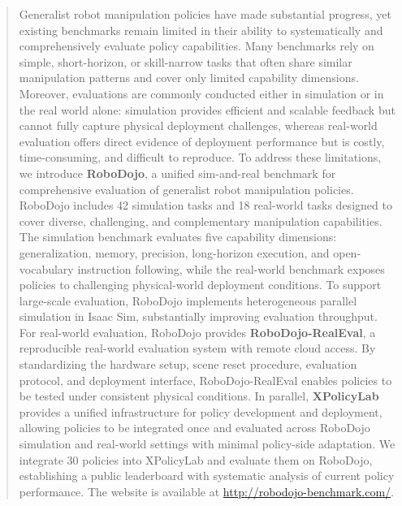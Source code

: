 \begin{abstract}

Generalist robot manipulation policies have made substantial progress, yet existing benchmarks remain limited in their ability to systematically and comprehensively evaluate policy capabilities. Many benchmarks rely on simple, short-horizon, or skill-narrow tasks that often share similar manipulation patterns and cover only limited capability dimensions. Moreover, evaluations are commonly conducted either in simulation or in the real world alone: simulation provides efficient and scalable feedback but cannot fully capture physical deployment challenges, whereas real-world evaluation offers direct evidence of deployment performance but is costly, time-consuming, and difficult to reproduce. To address these limitations, we introduce \textbf{\textcolor{Blue_1}{RoboDojo}}, a unified sim-and-real benchmark for comprehensive evaluation of generalist robot manipulation policies. RoboDojo includes 42 simulation tasks and 18 real-world tasks designed to cover diverse, challenging, and complementary manipulation capabilities. The simulation benchmark evaluates five capability dimensions: generalization, memory, precision, long-horizon execution, and open-vocabulary instruction following, while the real-world benchmark exposes policies to challenging physical-world deployment conditions. To support large-scale evaluation, RoboDojo implements heterogeneous parallel simulation in Isaac Sim, substantially improving evaluation throughput. For real-world evaluation, RoboDojo provides \textbf{\textcolor{Blue_1}{RoboDojo-RealEval}}, a reproducible real-world evaluation system with remote cloud access. By standardizing the hardware setup, scene reset procedure, evaluation protocol, and deployment interface, RoboDojo-RealEval enables policies to be tested under consistent physical conditions. In parallel, \textbf{\textcolor{Blue_1}{XPolicyLab}} provides a unified infrastructure for policy development and deployment, allowing policies to be integrated once and evaluated across RoboDojo simulation and real-world settings with minimal policy-side adaptation. We integrate 30 policies into XPolicyLab and evaluate them on RoboDojo, establishing a public leaderboard with systematic analysis of current policy performance. The website is available at \href{http://robodojo-benchmark.com/}{http://robodojo-benchmark.com/}.

\vspace{0.6em}
\begin{tcolorbox}[
colback=Blue_1!5,
colframe=Blue_1!55,
boxrule=0.5pt,
arc=2pt,
left=6pt,
right=6pt,
top=4pt,
bottom=4pt
]
\small


\end{tcolorbox}
\end{abstract}
